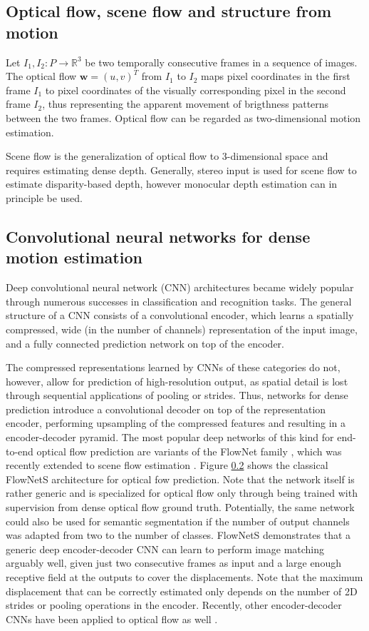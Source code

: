 \subsection{Optical flow, scene flow and structure from motion}
Let $I_1,I_2 : P \to \mathbb{R}^3$ be two temporally consecutive frames in a
sequence of images.
The optical flow
$\mathbf{w} = (u, v)^T$ from $I_1$ to $I_2$
maps pixel coordinates in the first frame $I_1$ to pixel coordinates of the
visually corresponding pixel in the second frame $I_2$,
thus representing the apparent movement of brigthness patterns between the two frames.
Optical flow can be regarded as two-dimensional motion estimation.

Scene flow is the generalization of optical flow to 3-dimensional space and
requires estimating dense depth. Generally, stereo input is used for scene flow
to estimate disparity-based depth, however monocular depth estimation can in
principle be used.

\subsection{Convolutional neural networks for dense motion estimation}
Deep convolutional neural network (CNN) architectures
\cite{ImageNetCNN, VGGNet, ResNet}
became widely popular through numerous successes in classification and recognition tasks.
The general structure of a CNN consists of a convolutional encoder, which
learns a spatially compressed, wide (in the number of channels) representation of the input image,
and a fully connected prediction network on top of the encoder.

The compressed representations learned by CNNs of these categories do not, however, allow
for prediction of high-resolution output, as spatial detail is lost through sequential applications
of pooling or strides.
Thus, networks for dense prediction introduce a convolutional decoder on top of the representation encoder,
performing upsampling of the compressed features and resulting in a encoder-decoder pyramid.
The most popular deep networks of this kind for end-to-end optical flow prediction
are variants of the FlowNet family \cite{FlowNet, FlowNet2},
which was recently extended to scene flow estimation \cite{SceneFlowDataset}.
Figure \ref{} shows the classical FlowNetS architecture for optical fow prediction.
Note that the network itself is rather generic and is specialized for optical flow only through being trained
with supervision from dense optical flow ground truth.
Potentially, the same network could also be used for semantic segmentation if
the number of output channels was adapted from two to the number of classes. %
FlowNetS demonstrates that a generic deep encoder-decoder CNN can learn to perform image matching arguably well,
given just two consecutive frames as input and a large enough receptive field at the outputs to cover the displacements.
Note that the maximum displacement that can be correctly estimated only depends on the number of 2D strides or pooling
operations in the encoder.
Recently, other encoder-decoder CNNs have been applied to optical flow as well \cite{DenseNetDenseFlow}.

